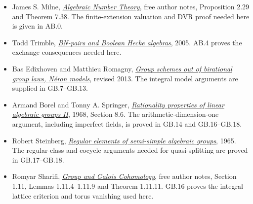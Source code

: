 \documentclass[
  11pt,
]{article}
\begin{document}
\begin{itemize}
  context of the local proof in AB.9.
\item
  James S. Milne,
  \href{https://www.jmilne.org/math/CourseNotes/ANT.pdf}{\emph{Algebraic
  Number Theory}}, free author notes, Proposition 2.29 and Theorem 7.38.
  The finite-extension valuation and DVR proof needed here is given in
  AB.0.
\item
  Todd Trimble,
  \href{https://math.ucr.edu/home/baez/trimble/BN-pairs_and_Boolean_Hecke_algebras.html}{\emph{BN-pairs
  and Boolean Hecke algebras}}, 2005. AB.4 proves the exchange
  consequences needed here.
\item
  Bas Edixhoven and Matthieu Romagny,
  \href{https://arxiv.org/abs/1204.1799v3}{\emph{Group schemes out of
  birational group laws, Néron models}}, revised 2013. The integral
  model arguments are supplied in GB.7--GB.13.
\item
  Armand Borel and Tonny A. Springer,
  \href{https://www.jstage.jst.go.jp/article/tmj1949/20/4/20_4_443/_article}{\emph{Rationality
  properties of linear algebraic groups II}}, 1968, Section 8.6. The
  arithmetic-dimension-one argument, including imperfect fields, is
  proved in GB.14 and GB.16--GB.18.
\item
  Robert Steinberg,
  \href{https://www.numdam.org/item/PMIHES_1965__25__49_0/}{\emph{Regular
  elements of semi-simple algebraic groups}}, 1965. The regular-class
  and cocycle arguments needed for quasi-splitting are proved in
  GB.17--GB.18.
\item
  Romyar Sharifi,
  \href{https://www.math.ucla.edu/~sharifi/groupcoh.pdf}{\emph{Group and
  Galois Cohomology}}, free author notes, Section 1.11, Lemmas
  1.11.4--1.11.9 and Theorem 1.11.11. GB.16 proves the integral lattice
  criterion and torus vanishing used here.
\end{itemize}
\end{document}
